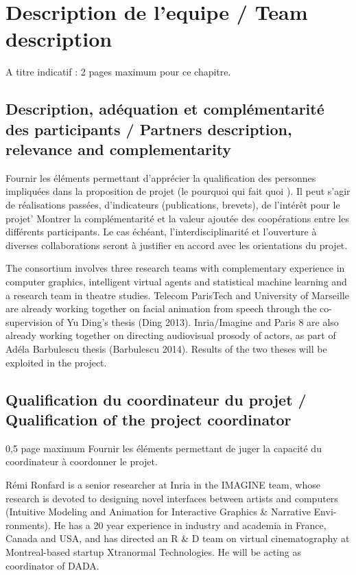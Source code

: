 
\section{Description de l'equipe / Team description}
\begin{xcomment}  
A titre indicatif : 2 pages maximum pour ce chapitre.
\end{xcomment}


\subsection{Description, ad\'equation et compl\'ementarit\'e des participants / Partners description, relevance and complementarity}
\begin{xcomment}  
Fournir les \'el\'ements permettant d'appr\'ecier la qualification des personnes impliqu\'ees dans la proposition de projet (le pourquoi qui fait quoi ). Il peut s'agir de r\'ealisations pass\'ees, d'indicateurs (publications, brevets), de l'int\'erêt pour le projet'
Montrer la compl\'ementarit\'e et la valeur ajout\'ee des coop\'erations entre les diff\'erents participants. 
Le cas \'ech\'eant, l'interdisciplinarit\'e et l'ouverture à diverses collaborations seront à justifier en accord avec les orientations du projet.
\end{xcomment}

The consortium involves three research teams with complementary experience in computer graphics, intelligent virtual agents and statistical machine learning and a research team in theatre studies. Telecom ParisTech and University of Marseille are already working together on facial animation from speech through the co-supervision of Yu Ding's thesis (Ding 2013). Inria/Imagine and Paris 8 are also already working together on directing audiovisual prosody of actors, as part of Ad\'ela Barbulescu thesis (Barbulescu 2014). Results of the two theses will be exploited in the project.

\subsection{Qualification du coordinateur du projet / Qualification of the project coordinator}
\begin{xcomment} 
0,5 page maximum
Fournir les \'el\'ements permettant de juger la capacit\'e du coordinateur à coordonner le projet.
\end{xcomment}

R\'emi Ronfard is a senior researcher at Inria in the IMAGINE team, whose research is devoted to designing novel interfaces between artists and computers (Intuitive Modeling and Animation for Interactive Graphics \& Narrative Envi-ronments). He has a 20 year experience in industry and academia in France, Canada and USA, and has directed an R \& D team on virtual cinematography at Montreal-based startup Xtranormal Technologies.  He will be acting as coordinator of DADA.



